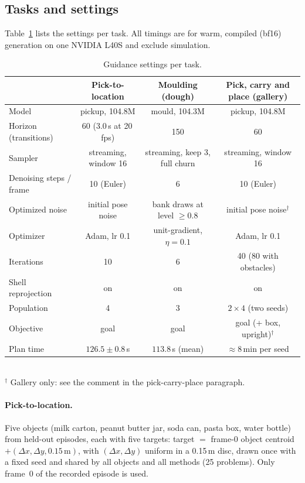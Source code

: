 \subsection{Tasks and settings}
\label{sec:task-settings}

Table~\ref{tab:guidance-settings} lists the settings per task. All timings are for warm, compiled (bf16) generation on
one NVIDIA L40S and exclude simulation.

\begin{table}[t]
\centering
\small
\caption{Guidance settings per task.}
\label{tab:guidance-settings}
\begin{tabular}{lccc}
\toprule
 & Pick-to-location & Moulding (dough) & Pick, carry and place (gallery) \\
\midrule
Model & pickup, 104.8M & mould, 104.3M & pickup, 104.8M \\
Horizon (transitions) & 60 (3.0\,s at 20\,fps) & 150 & 60 \\
Sampler & streaming, window 16 & streaming, keep 3, full churn & streaming, window 16 \\
Denoising steps / frame & 10 (Euler) & 6 & 10 (Euler) \\
Optimized noise & initial pose noise & bank draws at level $\ge 0.8$ & initial pose noise$^\dagger$ \\
Optimizer & Adam, lr 0.1 & unit-gradient, $\eta = 0.1$ & Adam, lr 0.1 \\
Iterations & 10 & 6 & 40 (80 with obstacles) \\
Shell reprojection & on & on & on \\
Population & 4 & 3 & $2 \times 4$ (two seeds) \\
Objective & goal & goal & goal (+ box, upright)$^\dagger$ \\
Plan time & $126.5 \pm 0.8$\,s & $113.8$\,s (mean) & $\approx 8$\,min per seed \\
\bottomrule
\end{tabular}
\\[2pt]\footnotesize $^\dagger$ Gallery only: see the comment in the pick-carry-place paragraph.
\end{table}

\paragraph{Pick-to-location.}
Five objects (milk carton, peanut butter jar, soda can, pasta box, water bottle) from held-out episodes, each with five
targets: target $=$ frame-0 object centroid $+ (\Delta x, \Delta y, 0.15\,\text{m})$, with $(\Delta x, \Delta y)$
uniform in a 0.15\,m disc, drawn once with a fixed seed and shared by all objects and all methods (25 problems).
Only frame~0 of the recorded episode is used.

